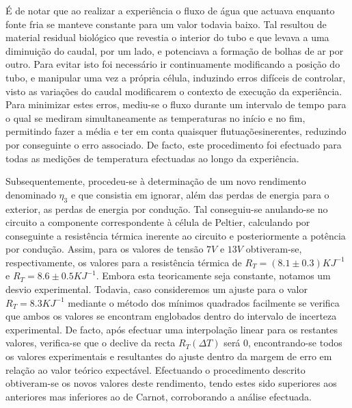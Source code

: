 \documentclass[9pt]{extarticle}
\begin{document}
\begin{multicols}{2}
\par É de notar que ao realizar a experiência o fluxo de água que actuava enquanto fonte fria se manteve constante para um valor todavia baixo. Tal resultou de material residual biológico que revestia o interior do tubo e que levava a uma diminuição do caudal, por um lado, e potenciava a formação de bolhas de ar por outro. Para evitar isto foi necessário ir continuamente modificando a posição do tubo, e manipular uma vez a própria célula, induzindo erros difíceis de controlar, visto as variações do caudal modificarem o contexto de execução da experiência. Para minimizar estes erros, mediu-se o fluxo durante um intervalo de tempo para o qual se mediram simultaneamente as temperaturas no início e no fim, permitindo fazer a média e ter em conta quaisquer flutuaçõesinerentes, reduzindo por conseguinte o erro associado. De facto, este procedimento foi efectuado para todas as medições de temperatura efectuadas ao longo da experiência.

\par Subsequentemente, procedeu-se à determinação de um novo rendimento denominado $\eta_3$ e que consistia em ignorar, além das perdas de energia para o exterior, as perdas de energia por condução. Tal conseguiu-se anulando-se no circuito a componente correspondente à célula de Peltier, calculando por conseguinte a resistência térmica inerente ao circuito e posteriormente a potência por condução. Assim, para os valores de tensão $7V$ e $13V$ obtiveram-se, respectivamente, os valores para a resistência térmica de $R_T=(8.1\pm0.3)KJ^{-1}$ e $R_T=8.6\pm0.5KJ^{-1}$. Embora esta teoricamente seja constante, notamos um desvio experimental. Todavia, caso consideremos um ajuste para o valor $R_T=8.3KJ^{-1}$ mediante o método dos mínimos quadrados facilmente se verifica que ambos os valores se encontram englobados dentro do intervalo de incerteza experimental. De facto, após efectuar uma interpolação linear para os restantes valores, verifica-se que o declive da recta $R_T(\Delta T)$ será $0$, encontrando-se todos os valores experimentais e resultantes do ajuste dentro da margem de erro em relação ao valor teórico expectável. Efectuando o procedimento descrito obtiveram-se os novos valores deste rendimento, tendo estes sido superiores aos anteriores mas inferiores ao de Carnot, corroborando a análise efectuada.


\end{multicols}
\end{document}
